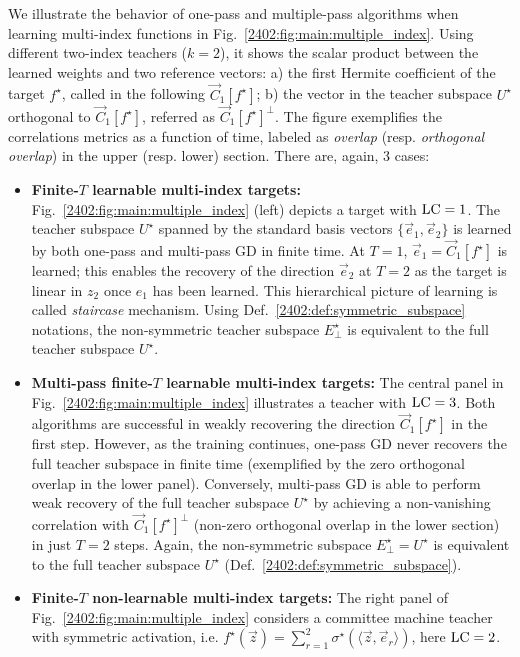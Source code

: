 We illustrate the behavior of one-pass and multiple-pass algorithms when learning multi-index functions in Fig.~\ref{2402:fig:main:multiple_index}. Using different two-index teachers ($k=2$), it shows the scalar product between the learned weights and two reference vectors: a) the first Hermite coefficient of the target $f^\star$, called in the following $\vec{C}_1[f^\star]$; b) the vector in the teacher subspace $U^\star$ orthogonal to $\vec{C}_1[f^\star]$, referred as $\vec{C}_1[f^\star]^\perp$. The figure exemplifies the correlations metrics as a function of time, labeled as \textit{overlap} (resp. \textit{orthogonal overlap}) in the upper (resp. lower) section. There are, again, 3 cases:
\begin{itemize}
    \item  \textbf{Finite-$T$ learnable multi-index targets:} Fig.~\ref{2402:fig:main:multiple_index} (left)  depicts a target with $\rm LC  = 1$.  The teacher subspace $U^\star$ spanned by the standard basis vectors $\{\vec e_1, \vec e_2\}$ is learned by both one-pass and multi-pass GD in finite time. At $T = 1$, $\vec e_1 = \vec{C}_1[f^\star]$ is learned; this enables the recovery of the direction $\vec e_2$ at $T = 2$ as the target is linear in $z_2$ once $e_1$ has been learned. This hierarchical picture of learning is called \textit{staircase} mechanism. Using Def.~\ref{2402:def:symmetric_subspace} notations, the non-symmetric teacher subspace $E^\star_\perp$ is equivalent to the full teacher subspace $U^\star$.
    \item \textbf{Multi-pass finite-$T$ learnable multi-index targets:}
    The central panel in Fig.~\ref{2402:fig:main:multiple_index} illustrates a teacher with $\rm LC =3$. Both algorithms are successful in weakly recovering the direction $\vec C_1[f^\star]$ in the first step. However, as the training continues, one-pass GD never recovers the full teacher subspace in finite time (exemplified by the zero orthogonal overlap in the lower panel). Conversely, multi-pass GD is able to perform weak recovery of the full teacher subspace $U^\star$ by achieving a non-vanishing correlation with $\vec C_1[f^\star]^\perp$ (non-zero orthogonal overlap in the lower section) in just $T=2$ steps. Again, the non-symmetric subspace $E_\perp^\star = U^\star$  is equivalent to the full teacher subspace $U^\star$ (Def.~\ref{2402:def:symmetric_subspace}).
    \item \textbf{Finite-$T$ non-learnable multi-index targets:} The right panel of Fig.~\ref{2402:fig:main:multiple_index} considers a committee machine teacher with symmetric activation, i.e. $f^\star(\vec z) = \sum_{r=1}^2 \sigma^\star \left(\langle \vec z, \vec e_r\rangle \right)$, here $\rm LC = 2$. 

\end{itemize}
